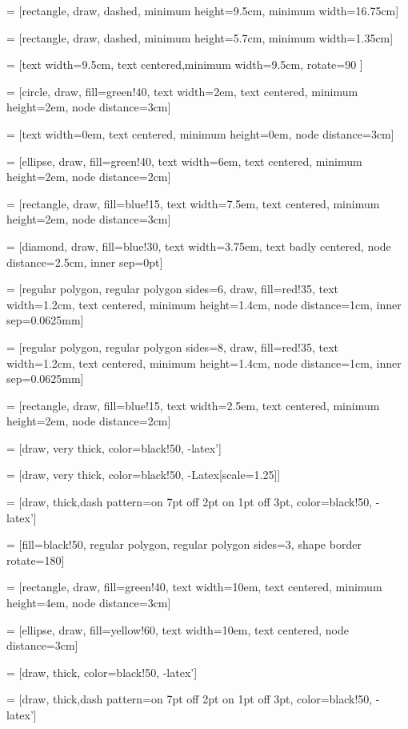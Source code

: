 \usepackage{tikz}
\usetikzlibrary{tikzmark}
\usetikzlibrary{shapes,arrows,arrows.meta,positioning}

 = [rectangle, draw, dashed, minimum height=9.5cm, minimum width=16.75cm]

 = [rectangle, draw, dashed, minimum height=5.7cm, minimum width=1.35cm]

 = [text width=9.5cm, text centered,minimum width=9.5cm, rotate=90 ]

 = [circle, draw, fill=green!40, text width=2em, text centered, minimum height=2em, node distance=3cm]

 = [text width=0em, text centered, minimum height=0em, node distance=3cm]

 = [ellipse, draw, fill=green!40, text width=6em, text centered, minimum height=2em, node distance=2cm]

 = [rectangle, draw, fill=blue!15, text width=7.5em, text centered, minimum height=2em, node distance=3cm]

 = [diamond, draw, fill=blue!30, text width=3.75em, text badly centered, node distance=2.5cm, inner sep=0pt]

 = [regular polygon, regular polygon sides=6, draw, fill=red!35, text width=1.2cm, text centered, minimum height=1.4cm, node distance=1cm, inner sep=0.0625mm]

 = [regular polygon, regular polygon sides=8, draw, fill=red!35, text width=1.2cm, text centered, minimum height=1.4cm, node distance=1cm, inner sep=0.0625mm]

 = [rectangle, draw, fill=blue!15, text width=2.5em, text centered, minimum height=2em, node distance=2cm]

 = [draw, very thick, color=black!50, -latex']

 = [draw, very thick, color=black!50, -{Latex[scale=1.25]}]

 = [draw, thick,dash pattern={on 7pt off 2pt on 1pt off 3pt}, color=black!50, -latex']

 = [fill=black!50, regular polygon, regular polygon sides=3, shape border rotate=180]

 = [rectangle, draw, fill=green!40, text width=10em, text centered, minimum height=4em, node distance=3cm]

 = [ellipse, draw, fill=yellow!60, text width=10em, text centered, node distance=3cm]

 = [draw, thick, color=black!50, -latex']

 = [draw, thick,dash pattern={on 7pt off 2pt on 1pt off 3pt}, color=black!50, -latex']
